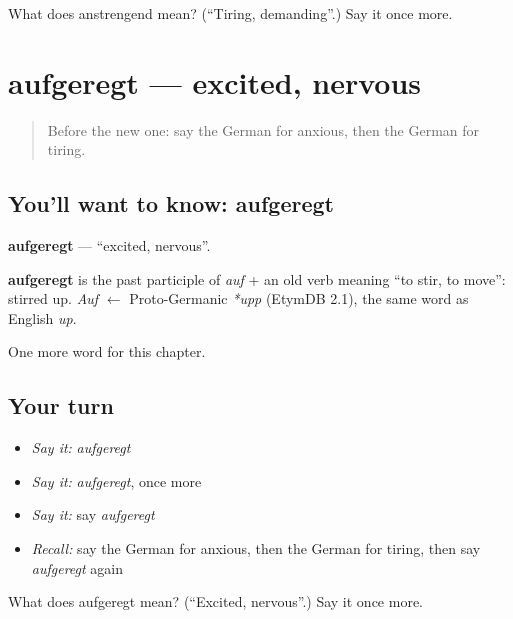 \begin{tcolorbox}[breakable,colback=teal!4,colframe=teal!35!black,title={Before you move on}]
What does anstrengend mean? (\textquotedblleft{}Tiring, demanding\textquotedblright{}.) Say it once more.
\end{tcolorbox}
\section[aufgeregt]{aufgeregt — excited, nervous}

\label{lesson:GE-C211-aufgeregt}



\begin{quote}
Before the new one: say the German for anxious, then the German for tiring.
\end{quote}

\subsection*{You'll want to know: aufgeregt}
\textbf{aufgeregt} — \textquotedblleft{}excited, nervous\textquotedblright{}.

\begin{cousinweb}
\textbf{aufgeregt} is the past participle of \emph{auf} + an old verb meaning \textquotedblleft{}to stir, to move\textquotedblright{}: stirred up. \emph{Auf} $\leftarrow$ Proto-Germanic \emph{*upp} (EtymDB 2.1), the same word as English \emph{up}.
\end{cousinweb}

\begin{grammarlens}[title={What you've built}]
One more word for this chapter.
\end{grammarlens}

\subsection*{Your turn}
\begin{itemize}
\raggedright
  \item \emph{Say it:} \emph{aufgeregt}
  \item \emph{Say it:} \emph{aufgeregt}, once more
  \item \emph{Say it:} say \emph{aufgeregt}
  \item \emph{Recall:} say the German for anxious, then the German for tiring, then say \emph{aufgeregt} again
\end{itemize}

\begin{tcolorbox}[breakable,colback=teal!4,colframe=teal!35!black,title={Before you move on}]
What does aufgeregt mean? (\textquotedblleft{}Excited, nervous\textquotedblright{}.) Say it once more.
\end{tcolorbox}
